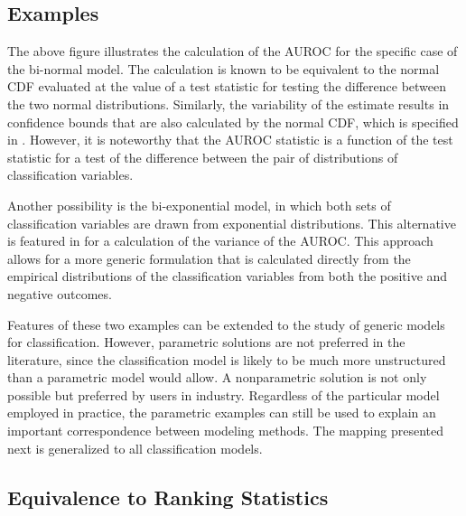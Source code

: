
% 




\subsection{Examples}


The above figure illustrates the calculation of the AUROC for the specific case of the bi-normal model.
The calculation is known to be equivalent to the normal CDF evaluated at the value of a test statistic for testing the difference between the two normal distributions.
Similarly, the variability of the estimate results in confidence bounds that are also calculated by the normal CDF, which is specified in \citet{demidenko2012}.
However, it is noteworthy that the AUROC statistic is a function of the test statistic for a test of the difference between the pair of distributions of classification variables.
%


Another possibility is the bi-exponential model, in which both sets of classification variables are drawn from exponential distributions.
%
This alternative is featured in \citet{hanleymcneil1982} for a calculation of the variance of the AUROC.
This approach allows for a more generic formulation that is calculated directly from the empirical distributions of the classification variables from both the positive and negative outcomes.
%

Features of these two examples can be extended to the study of generic models for classification.
However, parametric solutions are not preferred in the literature, since the classification model is likely to be much more unstructured than a parametric model would allow.
A nonparametric solution is not only possible but preferred by users in industry.
Regardless of the particular model employed in practice, the parametric examples can still be used to explain an important correspondence between modeling methods.
The mapping presented next is generalized to all classification models.

\subsection{Equivalence to Ranking Statistics}

